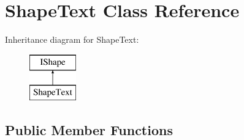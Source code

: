 \hypertarget{class_shape_text}{}\section{Shape\+Text Class Reference}
\label{class_shape_text}
Inheritance diagram for Shape\+Text\+:\begin{figure}[H]
\begin{center}
\leavevmode
\includegraphics[height=2.000000cm]{class_shape_text}
\end{center}
\end{figure}
\subsection*{Public Member Functions}
